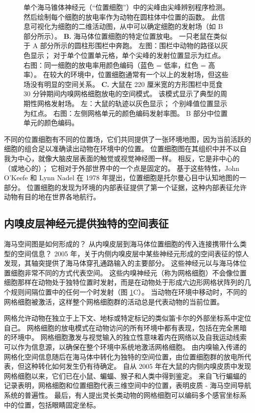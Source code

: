 \begin{figure}[htbp]
{		单个海马锥体神经元（“位置细胞”）中的尖峰由尖峰辨别程序检测。
		然后绘制每个细胞的放电率作为动物在圆柱体中位置的函数。
		此信息可视化为细胞的二维活动图，从中可以确定细胞的发射场（如 B 部分所示）\cite{muller1987spatial}。
		\textbf{B.} 海马体位置细胞的特定位置放电。
		一只老鼠在类似于 A 部分所示的圆柱形围栏中奔跑。
		左图：围栏中动物的路径以灰色显示；
		对于单个位置单元格，单个尖峰的发射位置显示为红点。
		右图：同一细胞的放电率用颜色编码（蓝色 = 低率，红色 = 高率）。
		在较大的环境中，位置细胞通常有一个以上的发射场，但这些场没有明显的空间关系。
		\textbf{C.} 大鼠在 220 厘米宽的方形围栏中觅食 30 分钟期间内嗅网格细胞放电的空间模式。
		该模式显示了典型的周期性网格发射场。
		左：大鼠的轨迹以灰色显示；
		个别峰值位置显示为红点。
		右图：左侧网格单元的颜色编码发射率图。
		B 部分中位置单元的颜色编码\cite{stensola2012entorhinal}。}
	\label{fig:54_12}
\end{figure}


不同的位置细胞有不同的位置场，它们共同提供了一张环境地图，因为当前活跃的细胞的组合足以准确读出动物在环境中的位置。
位置细胞图在其组织中并不以自我为中心，就像大脑皮层表面的触觉或视觉神经图一样。
相反，它是非中心的（或地心的）； 它相对于外部世界中的一个点是固定的。
基于这些特性，John O’Keefe 和 Lynn Nadel 在 1978 年提出，位置细胞是托尔曼心目中认知地图的一部分。
位置细胞的发现为环境的内部表征提供了第一个证据，这种内部表征允许动物有目的地在世界各地航行。



\subsection{内嗅皮层神经元提供独特的空间表征}

海马空间图是如何形成的？
从内嗅皮层到海马体位置细胞的传入连接携带什么类型的空间信息？
2005 年，关于内侧内嗅皮层中某些神经元形成的空间表征的惊人发现，其轴突提供了海马体穿孔通路输入的主要部分。
这些神经元以与海马体位置细胞非常不同的方式代表空间。
这些内嗅神经元（称为网格细胞）不会像位置细胞那样在动物处于独特位置时发射，而是在动物处于形成六边形网格状阵列的几个规则间隔位置中的任何一个时发射（图 \ref{fig:54_12}C）。
当动物在环境中移动时，不同的网格细胞被激活，这样整个网格细胞群的活动总是代表动物的当前位置。


网格允许动物在独立于上下文、地标或特定标记的类似笛卡尔的外部坐标系中定位自己。
网格细胞的放电模式在动物访问的所有环境中都有表现，包括在完全黑暗的环境中。
网格细胞激发与视觉输入的独立性意味着内在网络以及自我运动线索可以作为信息源，以确保在整个环境中系统地激活网格细胞。
由内嗅输入传递的网格化空间信息随后在海马体中转化为独特的空间位置，由位置细胞群的放电所代表，但这种转化如何发生仍有待确定。
自从 2005 年在大鼠的内侧内嗅皮质中发现网格细胞以来，它们已在小鼠、蝙蝠、猴子和人类中得到鉴定。
来自飞行蝙蝠的记录表明，网格细胞和位置细胞代表三维空间中的位置，表明皮质 - 海马空间导航系统的普遍性。
最后，有人提出灵长类动物的网格细胞可以编码多个感官坐标系中的位置，包括眼睛固定坐标。


